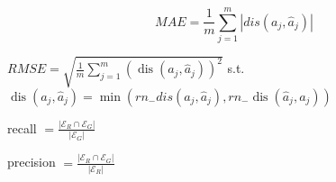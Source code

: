 \begin{equation} M A E=\frac{1}{m} \sum_{j=1}^{m}\left|d i s\left(a_{j}, \hat{a}_{j}\right)\right| \end{equation}

$ R M S E=\sqrt{\frac{1}{m} \sum_{j=1}^{m}\left(\operatorname{dis}\left(a_{j}, \hat{a}_{j}\right)\right)^{2}} $
s.t. $ \operatorname{dis}\left(a_{j}, \hat{a}_{j}\right)=\min \left(r n_{-} d i s\left(a_{j}, \hat{a}_{j}\right), r n_{-} \operatorname{dis}\left(\hat{a}_{j}, a_{j}\right)\right) $

recall $ =\frac{\left|\mathcal{E}_{R} \cap \mathcal{E}_{G}\right|}{\left|\mathcal{E}_{G}\right|} $

precision $ =\frac{\left|\mathcal{E}_{R} \cap \mathcal{E}_{G}\right|}{\left|\mathcal{E}_{R}\right|} $